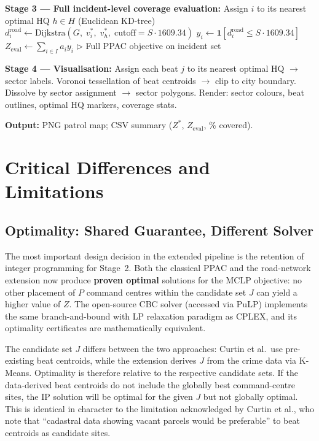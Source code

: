 \documentclass[12pt]{article}
\begin{document}
\begin{algorithm}[H]
\begin{algorithmic}[1]
\State \textbf{Stage 3 --- Full incident-level coverage evaluation:}
        \State Assign $i$ to its nearest optimal HQ $h \in H$ (Euclidean KD-tree)
        \State $d^{\mathrm{road}}_i \leftarrow
               \text{Dijkstra}(G,\; v^*_i,\; v^*_h,\; \text{cutoff}=S \cdot 1609.34)$
        \State $y_i \leftarrow \mathbf{1}[d^{\mathrm{road}}_i \le S \cdot 1609.34]$
    \EndFor
    \State $Z_{\text{eval}} \leftarrow \sum_{i \in I} a_i y_i$
           \hfill $\triangleright$ Full PPAC objective on incident set

\State \textbf{Stage 4 --- Visualisation:}
    \Statex \quad Assign each beat $j$ to its nearest optimal HQ $\to$ sector labels.
    \Statex \quad Voronoi tessellation of beat centroids $\to$ clip to city boundary.
    \Statex \quad Dissolve by sector assignment $\to$ sector polygons.
    \Statex \quad Render: sector colours, beat outlines, optimal HQ markers, coverage stats.

\State \textbf{Output:} PNG patrol map; CSV summary ($Z^*$, $Z_{\text{eval}}$, \% covered).
\end{algorithmic}
\end{algorithm}

\section{Critical Differences and Limitations}

\subsection{Optimality: Shared Guarantee, Different Solver}

The most important design decision in the extended pipeline is the retention of
integer programming for Stage~2.  Both the classical PPAC and the road-network
extension now produce \textbf{proven optimal} solutions for the MCLP objective:
no other placement of $P$ command centres within the candidate set $J$ can
yield a higher value of $Z$.  The open-source CBC solver (accessed via PuLP)
implements the same branch-and-bound with LP relaxation paradigm as CPLEX, and
its optimality certificates are mathematically equivalent.

The candidate set $J$ differs between the two approaches: Curtin et al.\ use
pre-existing beat centroids, while the extension derives $J$ from the crime
data via K-Means.  Optimality is therefore relative to the respective candidate
sets.  If the data-derived beat centroids do not include the globally best
command-centre sites, the IP solution will be optimal for the given $J$ but not
globally optimal.  This is identical in character to the limitation acknowledged
by Curtin et al., who note that ``cadastral data showing vacant parcels would
be preferable'' to beat centroids as candidate sites.
\end{document}
